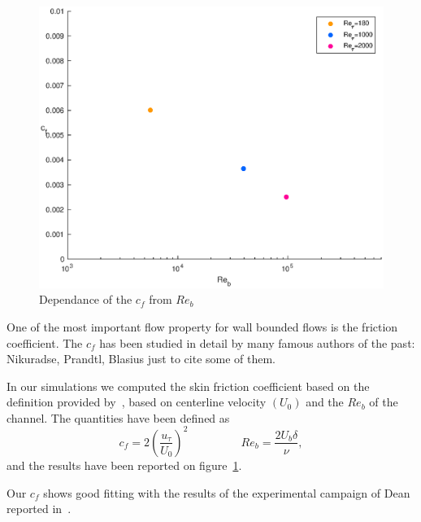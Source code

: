 \begin{figure}
\begin{center}
\includegraphics[scale=0.55]{grafici/cf.eps}
\caption{Dependance of the $c_{f}$ from $Re_{b}$}
\label{cf}
\end{center}
\end{figure}


One of the most important flow property for wall bounded flows is the friction coefficient.
The $c_{f}$ has been studied in detail by many famous authors of the past: Nikuradse, Prandtl, Blasius just to cite some of them. \par
In our simulations we computed the skin friction coefficient based on the definition provided by~\cite[279]{pope}, based on centerline velocity $(U_{0})$ and the $Re_{b}$ of the channel.
The quantities have been defined as
\begin{equation*}
c_{f}= 2(\frac{u_{\tau}}{U_{0}})^{2}	\quad~\quad~\quad~\quad	Re_{b}= \frac{2 U_{b} \delta}{\nu},
\end{equation*}
and the results have been reported on figure~\ref{cf}. \par
Our $c_{f}$ shows good fitting with the results of the experimental campaign of Dean reported in~\cite{Dean}.\\~\par

